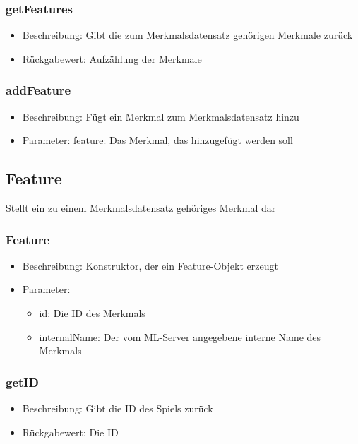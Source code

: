 \documentclass[a4paper]{scrreprt}
\begin{document}
    \subsubsection{getFeatures}
    \begin{itemize}
        \item Beschreibung: Gibt die zum Merkmalsdatensatz gehörigen Merkmale zurück
        \item Rückgabewert: Aufzählung der Merkmale
    \end{itemize}
    \subsubsection{addFeature}
    \begin{itemize}
        \item Beschreibung: Fügt ein Merkmal zum Merkmalsdatensatz hinzu
        \item Parameter: feature: Das Merkmal, das hinzugefügt werden soll
    \end{itemize}

    \subsection{Feature}
    Stellt ein zu einem Merkmalsdatensatz gehöriges Merkmal dar
    \subsubsection{Feature}
    \begin{itemize}
        \item Beschreibung: Konstruktor, der ein Feature-Objekt erzeugt
        \item Parameter:
        \begin{itemize}
            \item id: Die ID des Merkmals
            \item internalName: Der vom ML-Server angegebene interne Name des Merkmals
        \end{itemize}
    \end{itemize}
    \subsubsection{getID}
    \begin{itemize}
        \item Beschreibung: Gibt die ID des Spiels zurück
        \item Rückgabewert: Die ID
    \end{itemize}
\end{document}

